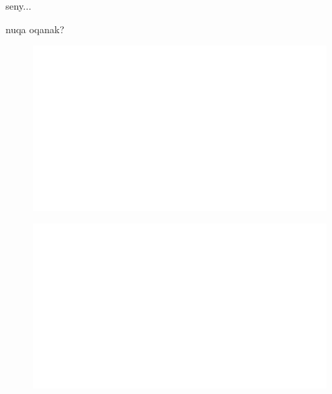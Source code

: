 \noindent
seny...

nuqa oqanak?


\begin{centering}
    \begin{figure}[h]
        \centering
        \includegraphics[width=\textwidth]{whyareyoucheckingthenameofthisfile.png}
    \end{figure}
\end{centering}

\begin{centering}
    \begin{figure}[h!]
        \centering
        \includegraphics[width=\textwidth]{whyareyoucheckingthenameofthisfile.png}
    \end{figure}
\end{centering}

